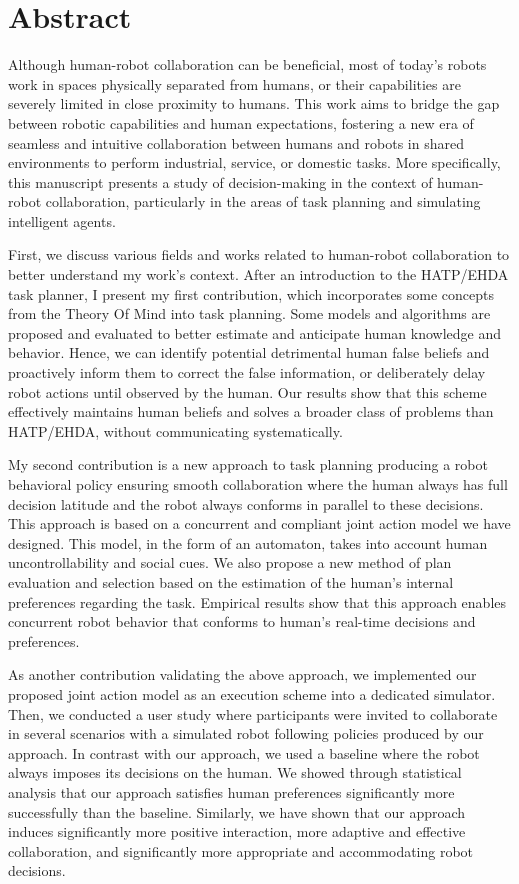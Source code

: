 \chapter*{Abstract}


Although human-robot collaboration can be beneficial, most of today's robots work in spaces physically separated from humans, or their capabilities are severely limited in close proximity to humans. This work aims to bridge the gap between robotic capabilities and human expectations, fostering a new era of seamless and intuitive collaboration between humans and robots in shared environments to perform industrial, service, or domestic tasks. More specifically, this manuscript presents a study of decision-making in the context of human-robot collaboration, particularly in the areas of task planning and simulating intelligent agents.

First, we discuss various fields and works related to human-robot collaboration to better understand my work's context. After an introduction to the HATP/EHDA task planner, I present my first contribution, which incorporates some concepts from the Theory Of Mind into task planning. Some models and algorithms are proposed and evaluated to better estimate and anticipate human knowledge and behavior. Hence, we can identify potential detrimental human false beliefs and proactively inform them to correct the false information, or deliberately delay robot actions until observed by the human. Our results show that this scheme effectively maintains human beliefs and solves a broader class of problems than HATP/EHDA, without communicating systematically.

My second contribution is a new approach to task planning producing a robot behavioral policy ensuring smooth collaboration where the human always has full decision latitude and the robot always conforms in parallel to these decisions. This approach is based on a concurrent and compliant joint action model we have designed. This model, in the form of an automaton, takes into account human uncontrollability and social cues. We also propose a new method of plan evaluation and selection based on the estimation of the human's internal preferences regarding the task. Empirical results show that this approach enables concurrent robot behavior that conforms to human's real-time decisions and preferences.

As another contribution validating the above approach, we implemented our proposed joint action model as an execution scheme into a dedicated simulator. Then, we conducted a user study where participants were invited to collaborate in several scenarios with a simulated robot following policies produced by our approach. In contrast with our approach, we used a baseline where the robot always imposes its decisions on the human. We showed through statistical analysis that our approach satisfies human preferences significantly more successfully than the baseline. Similarly, we have shown that our approach induces significantly more positive interaction, more adaptive and effective collaboration, and significantly more appropriate and accommodating robot decisions.

